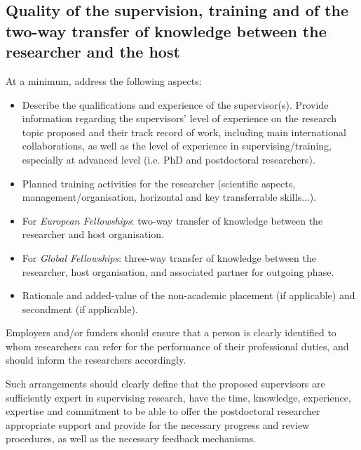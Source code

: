 \documentclass[12pt,draftproposal]{msca-pf}
\begin{document}

\subsection{Quality of the supervision, training and of the two-way transfer of
    knowledge between the researcher and the host}
\label{ssc:excellence:supervision}

At a minimum, address the following aspects:

\begin{itemize}
    \item Describe the qualifications and experience of the supervisor(s).
    Provide information regarding the supervisors' level of experience on the
    research topic proposed and their track record of work, including main
    international collaborations, as well as the level of experience in
    supervising/training, especially at advanced level (i.e. PhD and postdoctoral
    researchers).

    \item Planned training activities for the researcher (scientific aspects,
    management/organisation, horizontal and key transferrable skills...).

    \item For \emph{European Fellowships}: two-way transfer of knowledge between
    the researcher and host organisation.

    \item For \emph{Global Fellowships}: three-way transfer of knowledge between
    the researcher, host organisation, and associated partner for outgoing phase.

    \item Rationale and added-value of the non-academic placement (if applicable)
    and secondment (if applicable).
\end{itemize}

Employers and/or funders should ensure that a person is clearly identified to
whom researchers can refer for the performance of their professional duties, and
should inform the researchers accordingly.

Such arrangements should clearly define that the proposed supervisors are
sufficiently expert in supervising research, have the time, knowledge, experience,
expertise and commitment to be able to offer the postdoctoral researcher
appropriate support and provide for the necessary progress and review procedures,
as well as the necessary feedback mechanisms.
\end{document}
